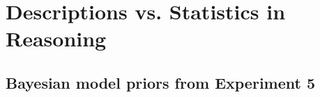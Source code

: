 \documentclass{../Dissertate}
\begin{document}
\doublespacing

\setcounter{chapter}{4}
\chapter{Descriptions vs. Statistics in Reasoning}








\begin{appendices}
  \appendixpage
  \graphicspath{{./../Appendices/}}
  \chapter{Bayesian model priors from Experiment 5}\label{appendix:exp5_bayes}
  
\end{appendices}



\end{document}

